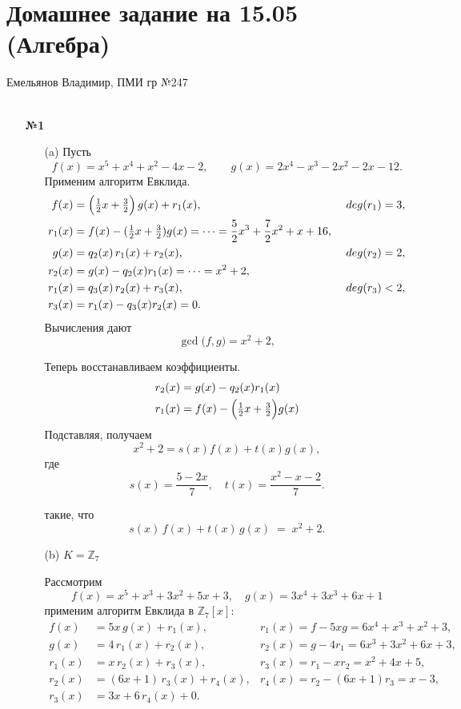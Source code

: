 \documentclass[a4paper]{article}
\begin{document}
\section*{Домашнее задание на 15.05 (Алгебра)}
{\large Емельянов Владимир, ПМИ гр №247}\\\\
\begin{enumerate}
  \item[\textbf{№1}]\begin{enumerate}
    \item[(a)]Пусть
    \[
    f(x)=x^5+x^4+x^2-4x-2,\qquad
    g(x)=2x^4 - x^3 -2x^2 -2x -12.
    \]
    Применим алгоритм Евклида.
    \begin{align*}
    f(x) &= \Bigl(\tfrac12 x + \tfrac32\Bigr)\,g(x) + r_1(x), &\ deg(r_1)=3,\\
    r_1(x) &= f(x) - (\tfrac12 x + \tfrac32)g(x) = \dots = \frac{5}{2}x^3 + \frac{7}{2}x^2 + x + 16,\\
    g(x) &= q_2(x)\,r_1(x) + r_2(x), &\ deg(r_2)=2,\\
    r_2(x) &= g(x) - q_2(x)r_1(x) = \dots = x^2 + 2,\\
    r_1(x) &= q_3(x)\,r_2(x) + r_3(x), &\ deg(r_3)<2,\\
    r_3(x) &= r_1(x) - q_3(x)r_2(x) = 0.
    \end{align*}
    Вычисления дают
    \[
    \gcd\bigl(f,g\bigr)=x^2+2,
    \]

    Теперь восстанавливаем коэффициенты.
    \begin{align*}
    r_2(x) &= g(x) - q_2(x)r_1(x)\\
    r_1(x) &= f(x) - \Bigl(\tfrac12 x + \tfrac32\Bigr)g(x)
    \end{align*}
    Подставляя, получаем
    \[
    x^2+2 = s(x)f(x) + t(x)g(x),
    \]
    где
    \[
    s(x)=\frac{5-2x}{7},\quad t(x)=\frac{x^2 - x -2}{7}.
    \]

    такие, что
    \[
    s(x)\,f(x) + t(x)\,g(x) \;=\; x^2+2.
    \]

    \item[(b)]$K=\mathbb{Z}_7$
    
    Рассмотрим
    \[
    f(x)=x^5+x^3+3x^2+5x+3,\quad g(x)=3x^4+3x^3+6x+1
    \]
    применим алгоритм Евклида в $\mathbb{Z}_7[x]$:
    \begin{align*}
    f(x)&=5x\,g(x) + r_1(x), & r_1(x)=f-5xg=6x^4+x^3+x^2+3,\\
    g(x)&=4\,r_1(x) + r_2(x), & r_2(x)=g-4r_1=6x^3+3x^2+6x+3,\\
    r_1(x)&=x\,r_2(x) + r_3(x), & r_3(x)=r_1-xr_2= x^2+4x+5,\\
    r_2(x)&=(6x+1)\,r_3(x) + r_4(x), & r_4(x)=r_2-(6x+1)r_3= x-3,\\
    r_3(x)&=3x+6\,r_4(x) +0.
    \end{align*}
  \end{enumerate}
\end{enumerate}
\end{document}
